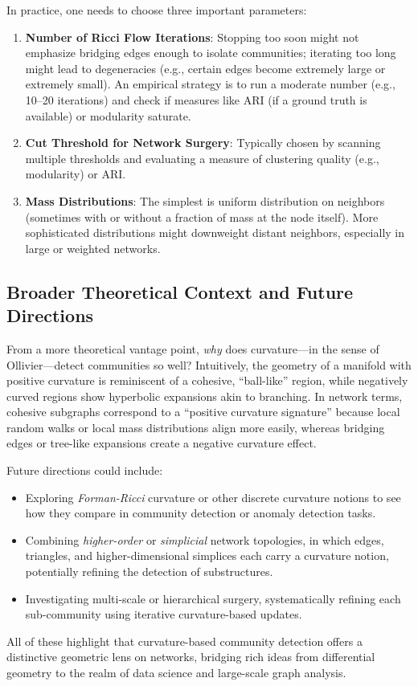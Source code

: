 In practice, one needs to choose three important parameters:
\begin{enumerate}
    \item \textbf{Number of Ricci Flow Iterations}: Stopping too soon might not emphasize bridging edges enough to isolate communities; iterating too long might lead to degeneracies (e.g., certain edges become extremely large or extremely small). An empirical strategy is to run a moderate number (e.g., 10--20 iterations) and check if measures like ARI (if a ground truth is available) or modularity saturate.
    \item \textbf{Cut Threshold for Network Surgery}: Typically chosen by scanning multiple thresholds and evaluating a measure of clustering quality (e.g., modularity) or ARI. 
    \item \textbf{Mass Distributions}: The simplest is uniform distribution on neighbors (sometimes with or without a fraction of mass at the node itself). More sophisticated distributions might downweight distant neighbors, especially in large or weighted networks.
\end{enumerate}

\subsection{Broader Theoretical Context and Future Directions}
From a more theoretical vantage point, \emph{why} does curvature---in the sense of Ollivier---detect communities so well? Intuitively, the geometry of a manifold with positive curvature is reminiscent of a cohesive, ``ball-like'' region, while negatively curved regions show hyperbolic expansions akin to branching. In network terms, cohesive subgraphs correspond to a “positive curvature signature” because local random walks or local mass distributions align more easily, whereas bridging edges or tree-like expansions create a negative curvature effect. 

Future directions could include:
\begin{itemize}
    \item Exploring \emph{Forman-Ricci} curvature or other discrete curvature notions to see how they compare in community detection or anomaly detection tasks.
    \item Combining \emph{higher-order} or \emph{simplicial} network topologies, in which edges, triangles, and higher-dimensional simplices each carry a curvature notion, potentially refining the detection of substructures.
    \item Investigating multi-scale or hierarchical surgery, systematically refining each sub-community using iterative curvature-based updates.
\end{itemize}

All of these highlight that curvature-based community detection offers a distinctive geometric lens on networks, bridging rich ideas from differential geometry to the realm of data science and large-scale graph analysis.